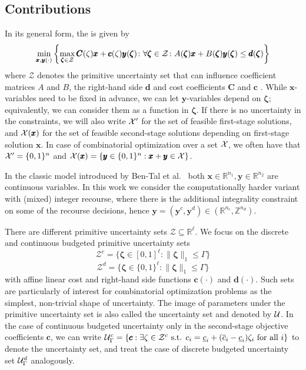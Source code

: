 \subsection{Contributions}

In its general form, the  is given by
\[ \min_{\pmb{x},\pmb{y}(\cdot)}  \left\{ \max_{\pmb{\zeta} \in \mathcal{Z}} \pmb{C}(\zeta)\pmb{x} + \pmb{c}(\zeta)\pmb{y}(\pmb{\zeta})  \colon \forall \pmb{\zeta} \in \mathcal{Z} \colon A(\pmb{\zeta}) \pmb{x} + B(\pmb{\zeta})\pmb{y}(\pmb{\zeta}) \leq \pmb{d}(\pmb{\zeta})  \right\} \]
where $\mathcal{Z}$ denotes the primitive uncertainty set that can influence coefficient matrices $A$ and $B$, the right-hand side $\pmb{d}$ and cost coefficients $\pmb{C}$ and $\pmb{c}$ . While $\pmb{x}$-variables need to be fixed in advance, we can let $\pmb{y}$-variables depend on $\pmb{\zeta}$; equivalently, we can consider them as a function in $\pmb{\zeta}$. If there is no uncertainty in the constraints, we will also write $\mathcal{X}'$ for the set of feasible first-stage solutions, and $\mathcal{X}(\pmb{x})$ for the set of feasible second-stage solutions depending on first-stage solution $\pmb{x}$. In case of combinatorial optimization over a set $\mathcal{X}$, we often have that $\mathcal{X}'=\{0,1\}^n$ and $\mathcal{X}(\pmb{x}) = \{ \pmb{y}\in\{0,1\}^n : \pmb{x}+\pmb{y} \in\mathcal{X}\}$.

In the classic model introduced by Ben-Tal et al.~\cite{ben2004adjustable} both $\pmb{x} \in \mathbb{R}^{n_1}, \pmb{y} \in \mathbb{R}^{n_2}$ are continuous variables.
In this work we consider the computationally harder variant with (mixed) integer recourse, where there is the additional integrality constraint on some of the recourse decisions, hence $\pmb{y} = (\pmb{y}^c, \pmb{y}^{d}) \in (\mathbb{R}^{n_c}, \mathbb{Z}^{n_d})$.

There are different primitive uncertainty sets $\mathcal{Z} \subseteq \mathbb{R}^{\ell}$.
We focus on the discrete and continuous budgeted primitive uncertainty sets
\[ \mathcal{Z}^c =  \{ \pmb{\zeta} \in [0,1]^{\ell} \colon \| \pmb{\zeta} \|_1 \leq \Gamma \} \]
\[ \mathcal{Z}^d =  \{ \pmb{\zeta} \in \{0,1\}^{\ell} \colon \| \pmb{\zeta} \|_1 \leq \Gamma \} \]
with affine linear cost and right-hand side functions $\pmb{c}(\cdot)$ and $\pmb{d}(\cdot)$. Such sets are particularly of interest for combinatorial optimization problems as the simplest, non-trivial shape of uncertainty. The image of parameters under the primitive uncertainty set is also called the uncertainty set and denoted by $\mathcal{U}$. In the case of continuous budgeted uncertainty only in the second-stage objective coefficients $\pmb{c}$, we can write $\mathcal{U}^c_\Gamma = \{\pmb{c} : \exists \zeta \in \mathcal{Z}^c \text{ s.t. } c_i = \underline{c}_i + (\overline{c}_i - \underline{c}_i)\zeta_i \text{ for all } i\}$ to denote the uncertainty set, and treat the case of discrete budgeted uncertainty set $\mathcal{U}^d_\Gamma$ analogously.

